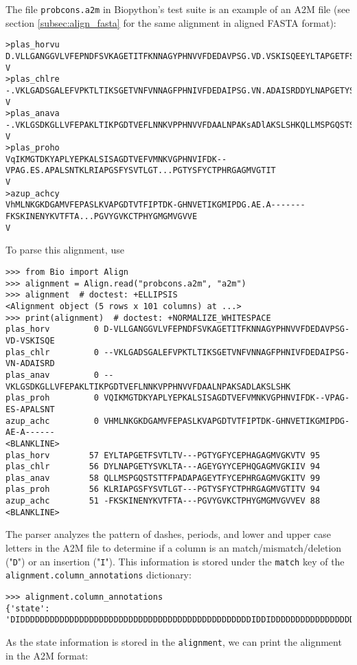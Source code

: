 The file \verb+probcons.a2m+ in Biopython's test suite is an example of an A2M file (see section \ref{subsec:align_fasta} for the same alignment in aligned FASTA format):
\begin{verbatim}
>plas_horvu
D.VLLGANGGVLVFEPNDFSVKAGETITFKNNAGYPHNVVFDEDAVPSG.VD.VSKISQEEYLTAPGETFSVTLTV...PGTYGFYCEPHAGAGMVGKVT
V
>plas_chlre
-.VKLGADSGALEFVPKTLTIKSGETVNFVNNAGFPHNIVFDEDAIPSG.VN.ADAISRDDYLNAPGETYSVKLTA...AGEYGYYCEPHQGAGMVGKII
V
>plas_anava
-.VKLGSDKGLLVFEPAKLTIKPGDTVEFLNNKVPPHNVVFDAALNPAKsADlAKSLSHKQLLMSPGQSTSTTFPAdapAGEYTFYCEPHRGAGMVGKIT
V
>plas_proho
VqIKMGTDKYAPLYEPKALSISAGDTVEFVMNKVGPHNVIFDK--VPAG.ES.APALSNTKLRIAPGSFYSVTLGT...PGTYSFYCTPHRGAGMVGTIT
V
>azup_achcy
VhMLNKGKDGAMVFEPASLKVAPGDTVTFIPTDK-GHNVETIKGMIPDG.AE.A-------FKSKINENYKVTFTA...PGVYGVKCTPHYGMGMVGVVE
V
\end{verbatim}
To parse this alignment, use
\begin{verbatim}
>>> from Bio import Align
>>> alignment = Align.read("probcons.a2m", "a2m")
>>> alignment  # doctest: +ELLIPSIS
<Alignment object (5 rows x 101 columns) at ...>
>>> print(alignment)  # doctest: +NORMALIZE_WHITESPACE
plas_horv         0 D-VLLGANGGVLVFEPNDFSVKAGETITFKNNAGYPHNVVFDEDAVPSG-VD-VSKISQE
plas_chlr         0 --VKLGADSGALEFVPKTLTIKSGETVNFVNNAGFPHNIVFDEDAIPSG-VN-ADAISRD
plas_anav         0 --VKLGSDKGLLVFEPAKLTIKPGDTVEFLNNKVPPHNVVFDAALNPAKSADLAKSLSHK
plas_proh         0 VQIKMGTDKYAPLYEPKALSISAGDTVEFVMNKVGPHNVIFDK--VPAG-ES-APALSNT
azup_achc         0 VHMLNKGKDGAMVFEPASLKVAPGDTVTFIPTDK-GHNVETIKGMIPDG-AE-A------
<BLANKLINE>
plas_horv        57 EYLTAPGETFSVTLTV---PGTYGFYCEPHAGAGMVGKVTV 95
plas_chlr        56 DYLNAPGETYSVKLTA---AGEYGYYCEPHQGAGMVGKIIV 94
plas_anav        58 QLLMSPGQSTSTTFPADAPAGEYTFYCEPHRGAGMVGKITV 99
plas_proh        56 KLRIAPGSFYSVTLGT---PGTYSFYCTPHRGAGMVGTITV 94
azup_achc        51 -FKSKINENYKVTFTA---PGVYGVKCTPHYGMGMVGVVEV 88
<BLANKLINE>
\end{verbatim}
The parser analyzes the pattern of dashes, periods, and lower and upper case letters in the A2M file to determine if a column is an match/mismatch/deletion ("\verb|D|") or an insertion ("\verb|I|"). This information is stored under the \verb+match+ key of the \verb+alignment.column_annotations+ dictionary:
\begin{verbatim}
>>> alignment.column_annotations
{'state': 'DIDDDDDDDDDDDDDDDDDDDDDDDDDDDDDDDDDDDDDDDDDDDDDDDIDDIDDDDDDDDDDDDDDDDDDDDDDDIIIDDDDDDDDDDDDDDDDDDDDDD'}
\end{verbatim}
As the state information is stored in the \verb+alignment+, we can print the alignment in the A2M format:

